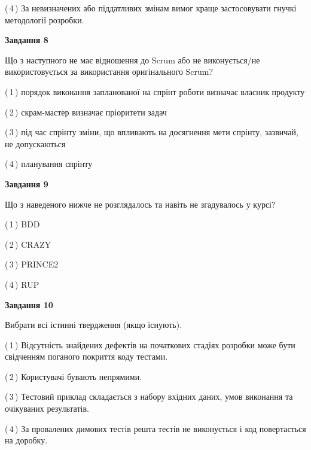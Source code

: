 \documentclass[10pt, ukrainian]{article}
\begin{document}
{\begin {large}
(\,4\,) За невизначених або піддатливих змінам вимог краще застосовувати гнучкі методології розробки. %


{\begin {center}\textbf{Завдання 8}\end {center}}\par
Що з наступного не має відношення до Scrum або не виконується/не використовується за використання оригінального Scrum?\par
\vspace{2mm}



(\,1\,) порядок виконання запланованої на спрінт роботи визначає власник продукту%



(\,2\,) скрам-мастер визначає пріоритети задач%



(\,3\,) під час спрінту зміни, що впливають на досягнення мети спрінту, зазвичай, не допускаються%



(\,4\,) планування спрінту%


{\begin {center}\textbf{Завдання 9}\end {center}}\par
Що з наведеного нижче не розглядалось та навіть не згадувалось у курсі?\par
\vspace{2mm}



(\,1\,) BDD%



(\,2\,) CRAZY%



(\,3\,) PRINCE2%



(\,4\,) RUP%


{\begin {center}\textbf{Завдання 10}\end {center}}\par
Вибрати всі істинні твердження (якщо існують).\par
\vspace{2mm}



(\,1\,) Відсутність знайдених дефектів на початкових стадіях розробки може бути свідченням поганого покриття коду тестами.%



(\,2\,) Користувачі бувають непрямими.%



(\,3\,) Тестовий приклад складається з набору вхідних даних, умов виконання та очікуваних результатів.%



(\,4\,) За провалених димових тестів решта тестів не виконується і код повертається на доробку.%



\end {large}}
\end{document}
